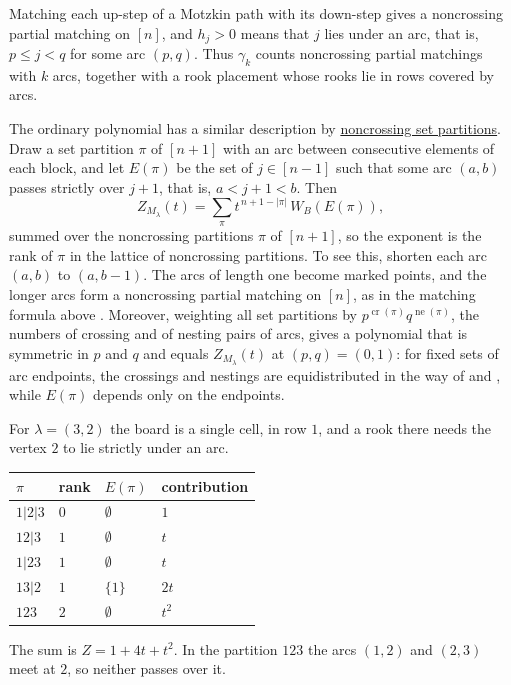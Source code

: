 Matching each up-step of a Motzkin path with its down-step gives a noncrossing
partial matching on $[n]$, and $h_j>0$ means that $j$ lies under an arc, that
is, $p\leq j<q$ for some arc $(p,q)$.  Thus $\gamma_k$ counts noncrossing
partial matchings with $k$ arcs, together with a rook placement whose rooks lie in
rows covered by arcs.

The ordinary polynomial has a similar description by
\hyperref[setPartitions]{noncrossing set partitions}.  Draw a set partition
$\pi$ of $[n+1]$ with an arc between consecutive elements of each block, and
let $E(\pi)$ be the set of $j\in[n-1]$ such that some arc $(a,b)$ passes
strictly over $j+1$, that is, $a<j+1<b$.  Then
\[
  Z_{M_\lambda}(t)=\sum_{\pi}t^{\,n+1-|\pi|}\,W_B(E(\pi)),
\]
summed over the noncrossing partitions $\pi$ of $[n+1]$, so the exponent is
the rank of $\pi$ in the lattice of noncrossing partitions.  To see this,
shorten each arc $(a,b)$ to $(a,b-1)$.  The arcs of length one become marked
points, and the longer arcs form a noncrossing partial matching on $[n]$, as in
the matching formula above \cite{ChenDengDu2005}.  Moreover, weighting all set
partitions by $p^{\operatorname{cr}(\pi)}q^{\operatorname{ne}(\pi)}$, the
numbers of crossing and of nesting pairs of arcs, gives a polynomial that is
symmetric in $p$ and $q$ and equals $Z_{M_\lambda}(t)$ at $(p,q)=(0,1)$: for
fixed sets of arc endpoints, the crossings and nestings are equidistributed in
the way of  and 
\cite{KasraouiZeng2006}, while $E(\pi)$ depends only on the endpoints.

\begin{example*}[Noncrossing partitions for $\lambda=(3,2)$]
For $\lambda=(3,2)$ the board is a single cell, in row $1$, and a rook there
needs the vertex $2$ to lie strictly under an arc.

\begin{tabular}{llll}
\toprule
$\pi$ & rank & $E(\pi)$ & contribution \\
\midrule
$1|2|3$ & $0$ & $\emptyset$ & $1$ \\
$12|3$ & $1$ & $\emptyset$ & $t$ \\
$1|23$ & $1$ & $\emptyset$ & $t$ \\
$13|2$ & $1$ & $\{1\}$ & $2t$ \\
$123$ & $2$ & $\emptyset$ & $t^2$ \\
\bottomrule
\end{tabular}

The sum is $Z=1+4t+t^2$.  In the partition $123$ the arcs $(1,2)$ and $(2,3)$
meet at $2$, so neither passes over it.
\end{example*}

